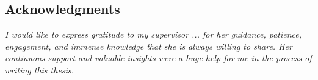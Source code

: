 
\vspace*{2cm}
\begin{addmargin}[1em]{1em}%
\hspace{8mm}
\begin{center}
\subsection*{Acknowledgments}
\end{center}
\large
\textit{I would like to express gratitude to my supervisor ... for her guidance, patience, engagement, and immense knowledge that she is always willing to share. Her continuous support and valuable insights were a huge help for me in the process of writing this thesis.}
\end{addmargin}
\vspace{2cm}